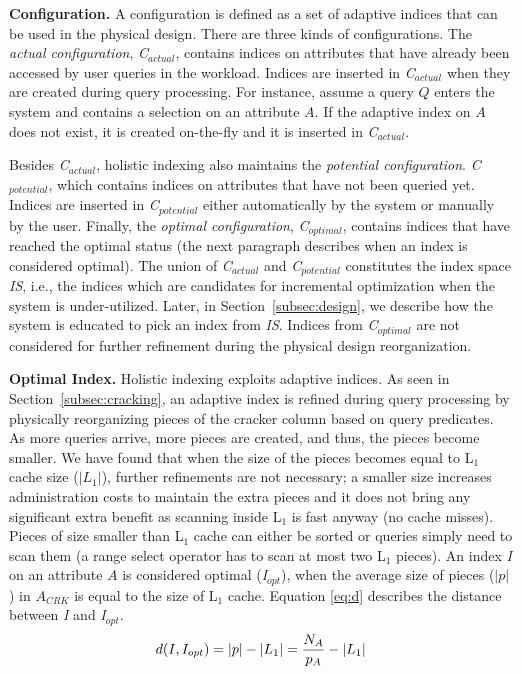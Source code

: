 \textbf{Configuration.} A configuration is defined as a set of adaptive indices that can be used in the physical design.
There are three kinds of configurations.
The \emph{actual configuration}, \emph{C$_{actual}$}, contains indices on attributes that have already been accessed by user queries in the workload.
Indices are inserted in \emph{C$_{actual}$} when they are created during query processing.
For instance, assume a query $Q$ enters the system and contains a selection on an attribute $A$.
If the adaptive index on $A$ does not exist, it is created on-the-fly and it is inserted in \emph{C$_{actual}$}.

Besides \emph{C$_{actual}$}, holistic indexing also maintains the \emph{potential configuration}. \emph{C$_{potential}$},
 which contains indices on attributes that have not been queried yet.
Indices are inserted in \emph{C$_{potential}$} either automatically by the system or manually by the user.
Finally, the \emph{optimal configuration}, \emph{C$_{optimal}$}, contains indices that have reached the optimal status (the next paragraph describes when an index is considered optimal).
The union of \emph{C$_{actual}$} and \emph{C$_{potential}$} constitutes the index space \emph{IS}, i.e., the indices which are candidates for
incremental optimization when the system is under-utilized.
Later, in Section~\ref{subsec:design}, we describe how the system is educated to pick an index from \emph{IS}.
Indices from \emph{C$_{optimal}$} are not considered for further refinement during the physical design reorganization.

\textbf{Optimal Index.} 
Holistic indexing exploits adaptive indices.
As seen in Section~\ref{subsec:cracking}, an adaptive index is refined during query 
processing by physically reorganizing pieces of the cracker column based on query predicates.
As more queries arrive, more pieces are created, and thus, the pieces become smaller.
We have found that when the size of the pieces becomes equal to L$_{1}$ cache size ($|L_1|$), further refinements are not necessary;
a smaller size increases administration costs to maintain the extra pieces and it does not bring any significant extra benefit as scanning inside L$_{1}$ is fast anyway (no cache misses).
Pieces of size smaller than L$_{1}$ cache can either be sorted 
or queries simply need to scan them (a range select operator has to scan at most two L$_{1}$ pieces).
An index \emph{I} on an attribute $A$ is considered optimal (\emph{I$_{opt}$}), 
when the average size of pieces ($|p|$) in $A_{CRK}$ is equal to the size of L$_{1}$ cache.
Equation \eqref{eq:d} describes the distance between \emph{I} and \emph{I$_{opt}$}.
\vspace{-0.25em}
\begin{equation}
d(I,I_{opt}) = |p| -|L_{1}| = \frac{N_A}{p_A} - |L_{1}|
\label{eq:d}
\vspace{-0.25em}
\end{equation}

